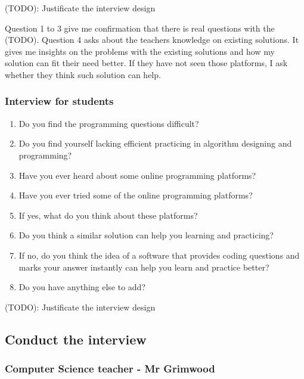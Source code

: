 \documentclass[a4paper]{report}
\begin{document}
(TODO): Justificate the interview design

Question 1 to 3 give me confirmation that there is real questions with the (TODO). Question 4 asks about the teachers knowledge on existing solutions. It gives me insights on the problems with the existing solutions and how my solution can fit their need better. If they have not seen those platforms, I ask whether they think such solution can help.

\subsubsection{Interview for students}

\begin{enumerate}
    \item Do you find the programming questions difficult?
    \item Do you find yourself lacking efficient practicing in algorithm designing and programming?
    \item Have you ever heard about some online programming platforms?
    \item Have you ever tried some of the online programming platforms?
    \item If yes, what do you think about these platforms?
    \item Do you think a similar solution can help you learning and practicing?
    \item If no, do you think the idea of a software that provides coding questions and marks your answer instantly can help you learn and practice better? 
    \item Do you have anything else to add?
\end{enumerate}

(TODO): Justificate the interview design

\subsection{Conduct the interview}

\subsubsection{Computer Science teacher - Mr Grimwood}
\end{document}
